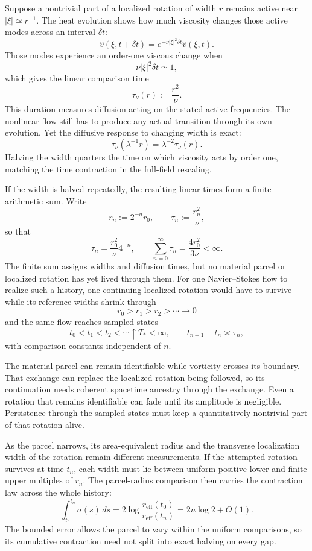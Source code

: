 
Suppose a nontrivial part of a localized rotation of width \(r\) remains active near \(|\xi|\simeq r^{-1}\). The heat evolution shows how much viscosity changes those active modes across an interval \(\delta t\):
\[
  \widehat v(\xi,t+\delta t)
  =
  e^{-\nu|\xi|^2\delta t}\widehat v(\xi,t).
\]
Those modes experience an order-one viscous change when
\[
  \nu|\xi|^2\delta t\simeq1,
\]
which gives the linear comparison time
\[
  \tau_\nu(r)
  :=
  \frac{r^2}{\nu}.
\]
This duration measures diffusion acting on the stated active frequencies. The nonlinear flow still has to produce any actual transition through its own evolution. Yet the diffusive response to changing width is exact:
\[
  \tau_\nu(\lambda^{-1}r)
  =
  \lambda^{-2}\tau_\nu(r).
\]
Halving the width quarters the time on which viscosity acts by order one, matching the time contraction in the full-field rescaling.


If the width is halved repeatedly, the resulting linear times form a finite arithmetic sum. Write
\[
  r_n:=2^{-n}r_0,
  \qquad
  \tau_n:=\frac{r_n^2}{\nu},
\]
so that
\[
  \tau_n
  =
  \frac{r_0^2}{\nu}4^{-n},
  \qquad
  \sum_{n=0}^{\infty}\tau_n
  =
  \frac{4r_0^2}{3\nu}
  <
  \infty.
\]
The finite sum assigns widths and diffusion times, but no material parcel or localized rotation has yet lived through them. For one Navier--Stokes flow to realize such a history, one continuing localized rotation would have to survive while its reference widths shrink through
\[
  r_0>r_1>r_2>\cdots\longrightarrow0
\]
and the same flow reaches sampled states
\[
  t_0<t_1<t_2<\cdots\uparrow T_*<\infty,
  \qquad
  t_{n+1}-t_n\asymp\tau_n,
\]
with comparison constants independent of \(n\).

The material parcel can remain identifiable while vorticity crosses its boundary. That exchange can replace the localized rotation being followed, so its continuation needs coherent spacetime ancestry through the exchange. Even a rotation that remains identifiable can fade until its amplitude is negligible. Persistence through the sampled states must keep a quantitatively nontrivial part of that rotation alive.

As the parcel narrows, its area-equivalent radius and the transverse localization width of the rotation remain different measurements. If the attempted rotation survives at time \(t_n\), each width must lie between uniform positive lower and finite upper multiples of \(r_n\). The parcel-radius comparison then carries the contraction law across the whole history:
\[
  \int_{t_0}^{t_n}\sigma(s)\,ds
  =
  2\log\frac{r_{\mathrm{eff}}(t_0)}{r_{\mathrm{eff}}(t_n)}
  =
  2n\log2+O(1).
\]
The bounded error allows the parcel to vary within the uniform comparisons, so its cumulative contraction need not split into exact halving on every gap.

